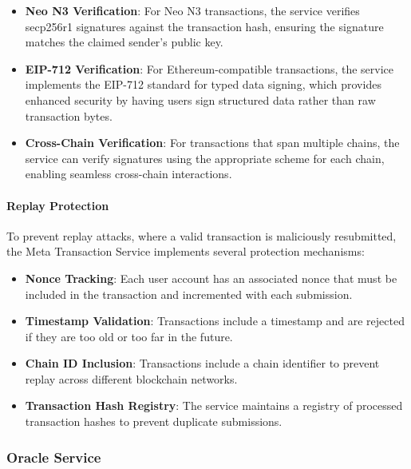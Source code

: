 \documentclass{article}
\begin{document}
\begin{itemize}
    \item \textbf{Neo N3 Verification}: For Neo N3 transactions, the service verifies secp256r1 signatures against the transaction hash, ensuring the signature matches the claimed sender's public key.
    
    \item \textbf{EIP-712 Verification}: For Ethereum-compatible transactions, the service implements the EIP-712 standard for typed data signing, which provides enhanced security by having users sign structured data rather than raw transaction bytes.
    
    \item \textbf{Cross-Chain Verification}: For transactions that span multiple chains, the service can verify signatures using the appropriate scheme for each chain, enabling seamless cross-chain interactions.
\end{itemize}

\paragraph{Replay Protection}
To prevent replay attacks, where a valid transaction is maliciously resubmitted, the Meta Transaction Service implements several protection mechanisms:

\begin{itemize}
    \item \textbf{Nonce Tracking}: Each user account has an associated nonce that must be included in the transaction and incremented with each submission.
    
    \item \textbf{Timestamp Validation}: Transactions include a timestamp and are rejected if they are too old or too far in the future.
    
    \item \textbf{Chain ID Inclusion}: Transactions include a chain identifier to prevent replay across different blockchain networks.
    
    \item \textbf{Transaction Hash Registry}: The service maintains a registry of processed transaction hashes to prevent duplicate submissions.
\end{itemize}

\subsubsection{Oracle Service}
\label{subsubsec:oracle}
\end{document}
